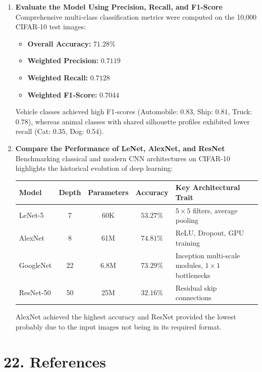 \documentclass[11pt]{article}
\begin{document}
\begin{enumerate}[label=\textbf{\arabic*.}]
    \item \textbf{Evaluate the Model Using Precision, Recall, and F1-Score} \\
    Comprehensive multi-class classification metrics were computed on the 10,000 CIFAR-10 test images:
    \begin{itemize}
        \item \textbf{Overall Accuracy:} $71.28\%$
        \item \textbf{Weighted Precision:} $0.7119$
        \item \textbf{Weighted Recall:} $0.7128$
        \item \textbf{Weighted F1-Score:} $0.7044$
    \end{itemize}
    Vehicle classes achieved high F1-scores (Automobile: $0.83$, Ship: $0.81$, Truck: $0.78$), whereas animal classes with shared silhouette profiles exhibited lower recall (Cat: $0.35$, Dog: $0.54$).

    \item \textbf{Compare the Performance of LeNet, AlexNet, and ResNet} \\
    Benchmarking classical and modern CNN architectures on CIFAR-10 highlights the historical evolution of deep learning:
    \begin{center}
    \begin{tabular}{|l|c|c|c|p{4.2cm}|}
    \hline
    \textbf{Model} & \textbf{Depth} & \textbf{Parameters} & \textbf{Accuracy} & \textbf{Key Architectural Trait} \\
    \hline
    LeNet-5 & 7 & 60K & $53.27\%$ & $5\times5$ filters, average pooling \\
    \hline
    AlexNet & 8 & 61M & $74.81\%$ & ReLU, Dropout, GPU training \\
    \hline
    GoogleNet & 22 & 6.8M & $73.29\%$ & Inception multi-scale modules, $1\times1$ bottlenecks \\
    \hline
    ResNet-50 & 50 & 25M & $32.16\%$ & Residual skip connections \\
    \hline
    \end{tabular}
    \end{center}
    AlexNet achieved the highest accuracy and ResNet provided the lowest probably due to the input images not being in its required format.
\end{enumerate}


\section*{22. References}
\end{document}
